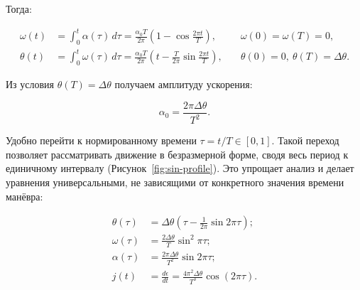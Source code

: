 Тогда:

\begin{equation}
	\begin{aligned}
		\omega(t) &= \int_{0}^{t} \alpha(\tau)\, d\tau
		= \frac{\alpha_0 T}{2 \pi} \!\left( 1 - \cos \frac{2 \pi t}{T} \right),
		&\quad \omega(0) = \omega(T) = 0, \\[6pt]
		\theta(t) &= \int_{0}^{t} \omega(\tau)\, d\tau
		= \frac{\alpha_0 T}{2 \pi} \!\left( t - \frac{T}{2 \pi} \sin \frac{2 \pi t}{T} \right),
		&\quad \theta(0) = 0,\ \theta(T) = \Delta \theta.
	\end{aligned}
\end{equation}

Из условия $\theta(T) = \Delta \theta$ получаем амплитуду ускорения:

\begin{equation}
	\alpha_{0} = \frac{2 \pi \Delta \theta}{T^{2}}.
\end{equation}

Удобно перейти к нормированному времени $\tau=t/T \in [0,1]$. Такой переход позволяет рассматривать движение в безразмерной форме, сводя весь период к единичному интервалу (Рисунок~\cref{fig:sin-profile}). Это упрощает анализ и делает уравнения универсальными, не зависящими от конкретного значения времени манёвра:

\begin{equation}
	\begin{aligned}
		\theta(\tau) &= \Delta \theta \!\left( \tau - \frac{1}{2 \pi} \sin 2 \pi \tau \right); \\
		\omega(\tau) &= \frac{2 \Delta \theta}{T} \sin^{2} \pi \tau; \\
		\alpha(\tau) &= \frac{2 \pi \Delta \theta}{T^{2}} \sin 2 \pi \tau; \\
		j(t) &= \frac{d \epsilon}{d t} = \frac{4 \pi^{2} \Delta \theta}{T^{3}} \cos\!\left(2 \pi \tau\right).\\
	\end{aligned}
\end{equation}

